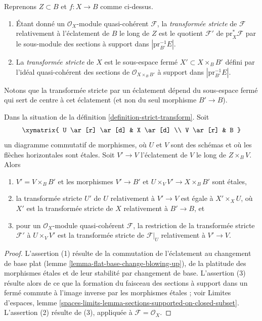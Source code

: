 \begin{definition}
\label{definition-strict-transform}
Reprenons $Z \subset B$ et $f : X \to B$ comme ci-dessus.
\begin{enumerate}
\item Étant donné un $\mathcal{O}_X$-module quasi-cohérent $\mathcal{F}$,
la {\it transformée stricte} de $\mathcal{F}$ relativement à l'éclatement
de $B$ le long de $Z$ est le quotient $\mathcal{F}'$ de $\text{pr}_X^*\mathcal{F}$
par le sous-module des sections à support dans $|\text{pr}_{B'}^{-1}E|$.
\item La {\it transformée stricte} de $X$ est le sous-espace fermé
$X' \subset X \times_B B'$ défini par l'idéal quasi-cohérent des
sections de $\mathcal{O}_{X \times_B B'}$ à support dans
$|\text{pr}_{B'}^{-1}E|$.
\end{enumerate}
\end{definition}

\noindent
Notons que la transformée stricte par un éclatement dépend du
sous-espace fermé qui sert de centre à cet éclatement
(et non du seul morphisme $B' \to B$).

\begin{lemma}
\label{lemma-strict-transform-local}
Dans la situation de la définition \ref{definition-strict-transform}.
Soit
$$
\xymatrix{
U \ar[r] \ar[d] & X \ar[d] \\
V \ar[r] & B
}
$$
un diagramme commutatif de morphismes, où $U$ et $V$ sont des schémas et où
les flèches horizontales sont étales. Soit $V' \to V$ l'éclatement de $V$
le long de $Z \times_B V$. Alors
\begin{enumerate}
\item $V' = V \times_B B'$ et les morphismes
$V' \to B'$ et $U \times_V V' \to X \times_B B'$ sont étales,
\item la transformée stricte $U'$ de $U$ relativement à $V' \to V$
est égale à $X' \times_X U$, où $X'$ est la transformée stricte de $X$
relativement à $B' \to B$, et
\item pour un $\mathcal{O}_X$-module quasi-cohérent $\mathcal{F}$, la
restriction de la transformée stricte $\mathcal{F}'$ à
$U \times_V V'$ est la transformée stricte de $\mathcal{F}|_U$ relativement
à $V' \to V$.
\end{enumerate}
\end{lemma}

\begin{proof}
L'assertion (1) résulte de la commutation de l'éclatement au changement de base
plat (lemme \ref{lemma-flat-base-change-blowing-up}), de la platitude des
morphismes étales et de leur stabilité par changement de base. L'assertion (3)
résulte alors de ce que la formation du faisceau des sections à support dans
un fermé commute à l'image inverse
par les morphismes étales ; voir Limites d'espaces, lemme
\ref{spaces-limits-lemma-sections-supported-on-closed-subset}.
L'assertion (2) résulte de (3), appliquée à $\mathcal{F} = \mathcal{O}_X$.
\end{proof}

